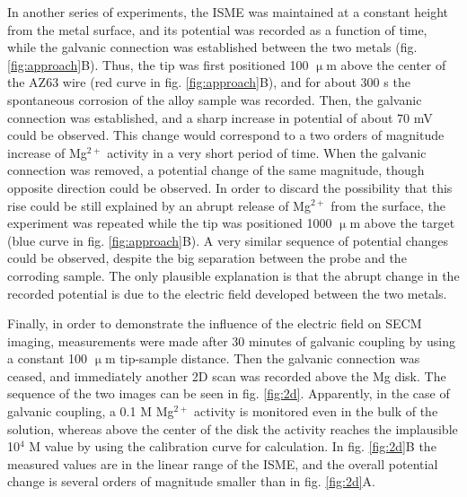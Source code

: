 \documentclass[3p]{elsarticle}
\begin{document}
In another series of experiments, the ISME was maintained at a constant height from the metal surface, and its potential was recorded as a function of time, while the galvanic connection was established between the two metals (fig. \ref{fig:approach}B). Thus, the tip was first positioned 100 $\upmu$m above the center of the AZ63 wire (red curve in fig. \ref{fig:approach}B), and for about 300 s the spontaneous corrosion of the alloy sample was recorded. Then, the galvanic connection was established, and a sharp increase in potential of about 70 mV could be observed. This change would correspond to a two orders of magnitude increase of Mg$^{2+}$ activity in a very short period of time. When the galvanic connection was removed, a potential change of the same magnitude, though opposite direction could be observed. In order to discard the possibility that this rise could be still explained by an abrupt release of Mg$^{2+}$ from the surface, the experiment was repeated while the tip was positioned 1000 $\upmu$m above the target (blue curve in fig. \ref{fig:approach}B). A very similar sequence of potential changes could be observed, despite the big separation between the probe and the corroding sample. The only plausible explanation is that the abrupt change in the recorded potential is due to the electric field developed between the two metals. 

Finally, in order to demonstrate the influence of the electric field on SECM imaging, measurements were made after 30 minutes of galvanic coupling by using a constant 100 $\upmu$m tip-sample distance. 
Then the galvanic connection was ceased, and immediately another 2D scan was recorded above the Mg disk. The sequence of the two images can be seen in fig. \ref{fig:2d}. Apparently, in the case of galvanic coupling, a 0.1 M Mg$^{2+}$ activity is monitored even in the bulk of the solution, whereas above the center of the disk the activity reaches the implausible 10$^{4}$ M value by using the calibration curve for calculation.   
In fig. \ref{fig:2d}B the measured values are in the linear range of the ISME, and the overall potential change is several orders of magnitude smaller than in fig. \ref{fig:2d}A.
\end{document}
